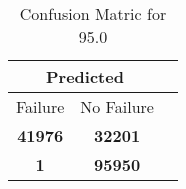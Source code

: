 \begin{table}[] 
\caption{Confusion Matric for 95.0} 
\label{Table: Prediction Accuracy-DMD95.0OnlySunEKF-ignoreReflection100.9EKF-top2-Reflection} 
\centering 
\begin{tabular} 
 {@{}ccc@{}} 
\toprule 
\multicolumn{2}{c}{\textbf{Predicted}}
 \\ \midrule 
\multicolumn{1}{|c|}{Failure} & 
\multicolumn{1}{c|}{No Failure}
 \\ \midrule 
\multicolumn{1}{|c|}{\color{green}\textbf{41976}} & 
\multicolumn{1}{c|}{\color{red}\textbf{32201}}
 \\ \midrule 
\multicolumn{1}{|c|}{\color{red}\textbf{1}} & 
\multicolumn{1}{c|}{\color{green}\textbf{95950}}
 \\ \bottomrule 
\end{tabular} 
\end{table} 
